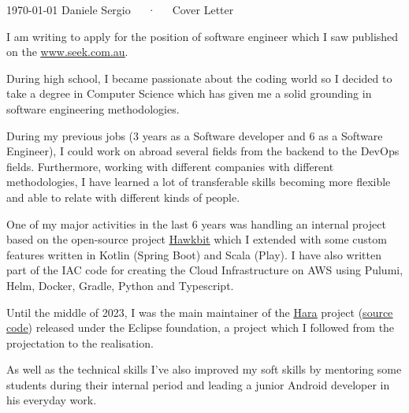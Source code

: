 \documentclass[11pt, a4paper]{awesome-cv}
\begin{document}
\makecvheader[R]

\makecvfooter
  {\today}
  {Daniele Sergio~~~·~~~Cover Letter}
  {}

\makelettertitle

\begin{cvletter}
I am writing to apply for the position of software engineer which I saw published on the \href{https://www.seek.com.au/job/74647191}{\underline{www.seek.com.au}}.

During high school, I became passionate about the coding world so I decided to take a degree in Computer Science which has given me a solid grounding in software engineering methodologies.

During my previous jobs (3 years as a Software developer and 6 as a Software Engineer), I could work on abroad several fields from the backend to the DevOps fields. Furthermore, working with different companies with different methodologies, I have learned a lot of transferable skills becoming more flexible and able to relate with different kinds of people.

One of my major activities in the last 6 years was handling an internal project based on the open-source project \href{https://eclipse.dev/hawkbit/}{\underline{Hawkbit}} which I extended with some custom features written in Kotlin (Spring Boot) and Scala (Play). I have also written part of the IAC code for creating the Cloud Infrastructure on AWS using Pulumi, Helm, Docker, Gradle, Python and Typescript.

Until the middle of 2023, I was the main maintainer of the \href{https://projects.eclipse.org/projects/iot.hawkbit.hara}{\underline{Hara}} project (\href{https://github.com/eclipse-hara/hara-ddiclient}{\underline{source code}}) released under the Eclipse foundation, a project which I followed from the projectation to the realisation.

As well as the technical skills I’ve also improved my soft skills by mentoring some students during their internal period and leading a junior Android developer in his everyday work.


\end{cvletter}
\end{document}
